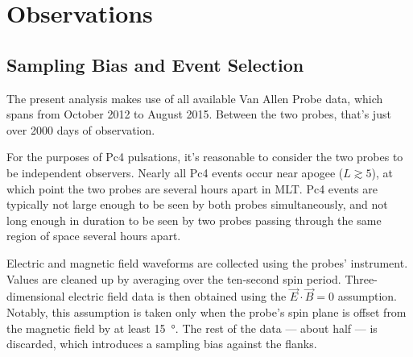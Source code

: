 


\chapter{Observations}
  \label{ch_rbsp}




\section{Sampling Bias and Event Selection}
  \label{sec_selection}

The present analysis makes use of all available Van Allen Probe data, which spans from October 2012 to August 2015. Between the two probes, that's just over 2000 days of observation. 

For the purposes of Pc4 pulsations, it's reasonable to consider the two probes to be independent observers. Nearly all Pc4 events occur near apogee ($L\gtrsim5$), at which point the two probes are several hours apart in MLT. Pc4 events are typically not large enough to be seen by both probes simultaneously, and not long enough in duration to be seen by two probes passing through the same region of space several hours apart. 


Electric and magnetic field waveforms are collected using the probes' \todo{$\cdots$} instrument. Values are cleaned up by averaging over the ten-second spin period. Three-dimensional electric field data is then obtained using the $\vec{E} \cdot \vec{B} = 0$ assumption. Notably, this assumption is taken only when the probe's spin plane is offset from the magnetic field by at least \SI{15}{\degree}. The rest of the data --- about half --- is discarded, which introduces a sampling bias against the flanks. 

